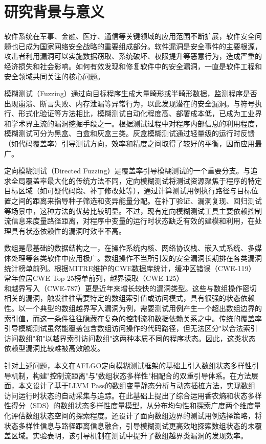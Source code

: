 \documentclass[bachelor]{njupthesis}
\begin{document}
\section{研究背景与意义}

软件系统在军事、金融、医疗、通信等关键领域的应用范围不断扩展，软件安全问题也已成为国家网络安全战略的重要组成部分。软件漏洞是安全事件的主要根源，攻击者利用漏洞可以实施数据窃取、系统破坏、权限提升等恶意行为，造成严重的经济损失和社会影响\cite{cncert2020}。如何有效发现和修复软件中的安全漏洞，一直是软件工程和安全领域共同关注的核心问题。

模糊测试（Fuzzing）通过向目标程序生成大量畸形或半畸形数据，监测程序是否出现崩溃、断言失败、内存泄漏等异常行为，以此发现潜在的安全漏洞\cite{AFLPLUSPLUS}。与符号执行、形式化验证等方法相比，模糊测试自动化程度高、部署成本低，已成为工业界和学术界主流的漏洞挖掘手段之一。根据测试过程中对程序内部信息的利用程度，模糊测试可分为黑盒、白盒和灰盒三类。灰盒模糊测试通过轻量级的运行时反馈（如代码覆盖率）引导测试方向，效率和精度之间取得了较好的平衡，因而应用最广。

定向模糊测试（Directed Fuzzing）\cite{directedGreybox}是覆盖率引导模糊测试的一个重要分支。与追求全局覆盖率最大化的传统方法不同，定向模糊测试将测试资源聚焦于程序的特定目标区域（如可疑代码段、补丁修改处等），通过计算测试用例执行路径与目标位置之间的距离来指导种子筛选和变异能量分配。在补丁验证、漏洞复现、回归测试等场景中，这种方法的优势比较明显。不过，现有定向模糊测试工具主要依赖控制流信息来度量路径距离，对程序中变量的运行时状态缺乏有效的建模和利用，在处理具有状态依赖性的漏洞时效率不高。

数组是最基础的数据结构之一，在操作系统内核、网络协议栈、嵌入式系统、多媒体处理等各类软件中应用极广。数组操作不当所引发的安全漏洞长期排在各类漏洞统计榜单前列。根据MITRE维护的CWE数据库统计，缓冲区错误（CWE-119）\cite{CWE119}常年位居CWE Top 25榜单前列，越界读取（CWE-125）\cite{CWE125}和越界写入（CWE-787）\cite{CWE787}更是近年来增长较快的漏洞类型。这些与数组操作密切相关的漏洞，触发往往需要特定的数组索引值或访问模式，具有很强的状态依赖性。以一个典型的数组越界写入漏洞为例，需要测试用例产生一个超出数组边界的索引值，而这一条件往往隐藏在复杂的控制流和数据依赖关系之中。传统的覆盖率引导模糊测试虽然能覆盖包含数组访问操作的代码路径，但无法区分"以合法索引访问数组"和"以越界索引访问数组"这两种本质不同的程序状态。因此，这类状态依赖型漏洞比较难被高效触发。

针对上述问题，本文在AFLGO定向模糊测试框架的基础上引入数组状态多样性引导机制，构建"控制流距离"与"数组状态多样性"相配合的双重引导体系。在方法层面，本文设计了基于LLVM Pass的数组变量静态分析与动态插桩方法，实现数组访问运行时状态的自动采集与追踪。在此基础上提出了综合运用香农熵和状态多样性得分（SDS）的数组状态多样性度量模型，从分布均匀性和探索广度两个维度量化评估数组状态空间的探索程度。还设计了面向数组边界的测试用例选择策略，将状态多样性信息与路径距离信息融合，引导模糊测试更高效地探索数组状态的未覆盖区域。实验表明，该引导机制在测试中提升了数组越界类漏洞的发现效率。
\end{document}
